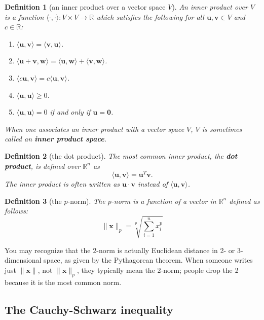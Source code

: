 \documentclass[draft,12pt]{report}
\newtheorem{definition}{Definition}
\renewcommand{\vec}[1]{\mathbf{#1}}
\begin{document}
\begin{definition}[an inner product over a vector space $V$]
    An inner product over $V$ is a function $\langle \cdot, \cdot \rangle : V \times V \rightarrow \mathbb R$ which satisfies the following for all $\vec{u}, \vec{v} \in V$ and $c \in \mathbb R$:
    \begin{enumerate}
        \item $\langle \vec{u}, \vec{v} \rangle = \langle \vec{v}, \vec{u} \rangle$.
        \item $\langle \vec{u} + \vec{v}, \vec{w} \rangle = \langle \vec{u}, \vec{w} \rangle + \langle \vec{v}, \vec{w} \rangle$.
        \item $\langle c\vec{u}, \vec{v} \rangle = c\langle \vec{u}, \vec{v} \rangle$.
        \item $\langle \vec{u}, \vec{u} \rangle \geq 0$.
        \item $\langle \vec{u}, \vec{u} \rangle = 0$ if and only if $\vec{u} = \vec{0}$.
    \end{enumerate}
    When one associates an inner product with a vector space $V$, $V$ is sometimes called an \textbf{inner product space}.
\end{definition}

\begin{definition}[the dot product]
    The most common inner product, the \textbf{dot product}, is defined over $\mathbb R^n$ as
    \[ \langle \vec{u}, \vec{v} \rangle = \vec{u}^T \vec{v}. \]
    The inner product is often written as $\vec{u} \cdot \vec{v}$ instead of $\langle \vec{u}, \vec{v} \rangle$.
\end{definition}

\begin{definition}[the $p$-norm]
    The $p$-norm is a function of a vector in $\mathbb R^n$ defined as follows:
    \[ \| \vec{x} \|_p = \sqrt[p]{\sum_{i = 1}^n x_i^p} \]
\end{definition}
You may recognize that the 2-norm is actually Euclidean distance in 2- or 3-dimensional space, as given by the Pythagorean theorem. When someone writes just $\| \vec{x} \|$, not $\| \vec{x} \|_p$, they typically mean the 2-norm; people drop the 2 because it is the most common norm.

\subsection{The Cauchy-Schwarz inequality}
\end{document}
